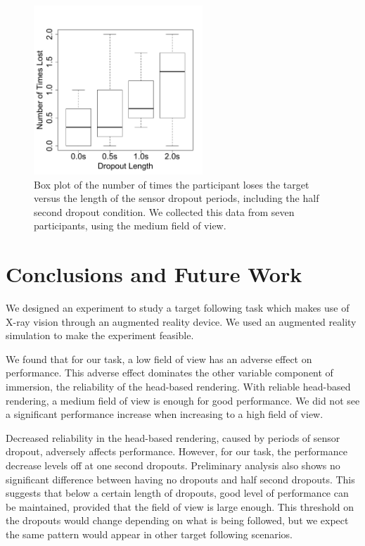 \documentclass{acmsiggraph}                     %
\begin{document}
\begin{figure}[htb]
	\centering
	\includegraphics[width=2.5in]{figures/extra.pdf}
	\caption{Box plot of the number of times the participant loses the target versus the length of the sensor dropout periods, including the half second dropout condition.  We collected this data from seven participants, using the medium field of view.}
\end{figure}


\section{Conclusions and Future Work}

We designed an experiment to study a target following task which makes use of X-ray vision through an augmented reality device.  We used an augmented reality simulation to make the experiment feasible.

We found that for our task, a low field of view has an adverse effect on performance.  This adverse effect dominates the other variable component of immersion, the reliability of the head-based rendering.  With reliable head-based rendering, a medium field of view is enough for good performance.  We did not see a significant performance increase when increasing to a high field of view.

Decreased reliability in the head-based rendering, caused by periods of sensor dropout, adversely affects performance.  However, for our task, the performance decrease levels off at one second dropouts.  Preliminary analysis also shows no significant difference between having no dropouts and half second dropouts.  This suggests that below a certain length of dropouts, good level of performance can be maintained, provided that the field of view is large enough.  This threshold on the dropouts would change depending on what is being followed, but we expect the same pattern would appear in other target following scenarios.
\end{document}
